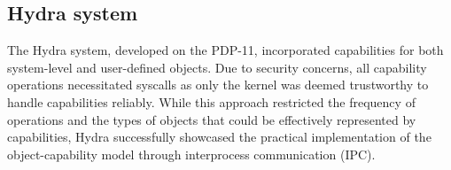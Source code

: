 \subsection{Hydra system}
The Hydra system\cite{wulf_hydra_1974}, developed on the PDP-11, incorporated capabilities for both system-level 
and user-defined objects. Due to security concerns, all capability operations necessitated 
syscalls as only the kernel was deemed trustworthy to handle capabilities reliably. While 
this approach restricted the frequency of operations and the types of objects that 
could be effectively represented by capabilities, Hydra successfully showcased the 
practical implementation of the object-capability model through interprocess communication (IPC).
\newline

